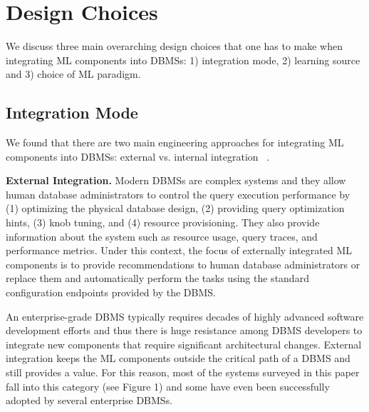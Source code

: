 \section{Design Choices}

We discuss three main overarching design choices that one has to make when integrating ML components into DBMSs: 1) integration mode, 2)  learning source and 3) choice of ML paradigm.


\subsection{Integration Mode}
We found that there are two main engineering approaches for integrating ML components into DBMSs: external vs. internal integration ~\cite{pavlo2019external}.

\vspace{2mm}
\noindent \textbf{External Integration.} Modern DBMSs are complex systems and they allow human database administrators to control the query execution performance by (1) optimizing the physical database design, (2) providing query optimization hints, (3) knob tuning, and (4) resource provisioning.
They also provide information about the system such as resource usage, query traces, and performance metrics.
Under this context, the focus of externally integrated ML components is to provide recommendations to human database administrators or replace them and automatically perform the tasks using the standard configuration endpoints provided by the DBMS.

An enterprise-grade DBMS typically requires decades of highly advanced software development efforts and thus there is huge resistance among DBMS developers to integrate new components that require significant architectural changes.
External integration keeps the ML components outside the critical path of a DBMS and still provides a value.
For this reason, most of the systems surveyed in this paper fall into this category (see Figure 1) and some have even been successfully adopted by several enterprise DBMSs.

